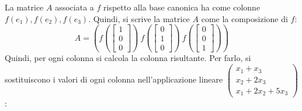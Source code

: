 \documentclass[a4paper]{article}
\begin{document}
	\noindent
	La matrice $A$ associata a $f$ rispetto alla base canonica ha come colonne $f\left(e_{1}\right), f\left(e_{2}\right), f\left(e_{3}\right)$. Quindi, si scrive la matrice $A$ come la composizione di $f$:
	\begin{equation*}
		A = \left( f\left(\begin{bmatrix}
			1 \\
			0 \\
			0
		\end{bmatrix}\right) \: f\left(\begin{bmatrix}
			0 \\
			1 \\
			0
		\end{bmatrix}\right) \: f\left(\begin{bmatrix}
			0 \\
			0 \\
			1
		\end{bmatrix}\right)\right)
	\end{equation*}
	Quindi, per ogni colonna si calcola la colonna risultante. Per farlo, si sostituiscono i valori di ogni colonna nell'applicazione lineare $\begin{pmatrix}
		x_{1} + x_{3} 	\\
		x_{2} + 2x_{3} 	\\
		x_{1} + 2x_{2} + 5x_{3}
	\end{pmatrix}$:
\end{document}
